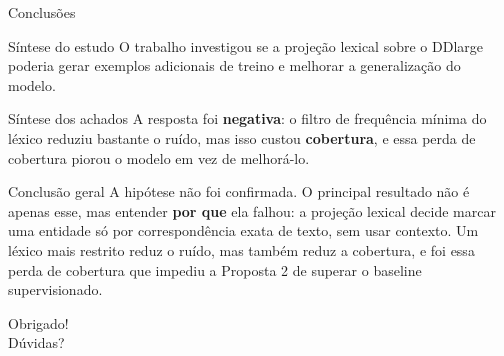 \documentclass[aspectratio=169, 9pt]{beamer}
\begin{document}
\begin{frame}{Conclusões}
  \begin{block}{Síntese do estudo}
    O trabalho investigou se a projeção lexical sobre o DDlarge poderia gerar exemplos adicionais de treino e melhorar a generalização do modelo.
  \end{block}

  \vspace{8pt}
  \begin{block}{Síntese dos achados}
    A resposta foi \textbf{negativa}: o filtro de frequência mínima do léxico reduziu bastante o ruído, mas isso custou \textbf{cobertura}, e essa perda de cobertura piorou o modelo em vez de melhorá-lo.
  \end{block}

  \vspace{8pt}
  \begin{exampleblock}{Conclusão geral}
    A hipótese não foi confirmada. O principal resultado não é apenas esse, mas entender \textbf{por que} ela falhou: a projeção lexical decide marcar uma entidade só por correspondência exata de texto, sem usar contexto. Um léxico mais restrito reduz o ruído, mas também reduz a cobertura, e foi essa perda de cobertura que impediu a Proposta 2 de superar o baseline supervisionado.
  \end{exampleblock}
\end{frame}

\begin{frame}[standout]
  Obrigado!\\[8pt]
  \large Dúvidas?
\end{frame}
\end{document}
